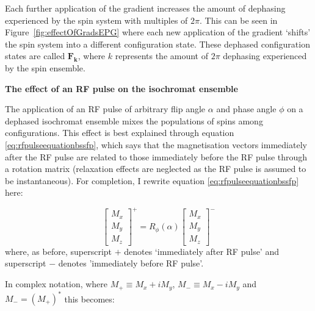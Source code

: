\hfill

Each further application of the gradient increases the amount of dephasing experienced by the spin system with multiples of $2\pi$.
This can be seen in Figure~\ref{fig:effectOfGradsEPG} where each new application of the gradient `shifts' the spin system into a different configuration state.
These dephased configuration states are called $\bm{F_k}$, where $k$ represents the amount of $2\pi$ dephasing experienced by the spin ensemble.

\hfill

\textbf{The effect of an RF pulse on the isochromat ensemble} 

The application of an RF pulse of arbitrary flip angle $\alpha$ and phase angle $\phi$ on a dephased isochromat ensemble mixes the populations of spins among configurations.
This effect is best explained through equation \ref{eq:rfpulseequationbssfp}, which says that the magnetisation vectors immediately after the RF pulse are related to those immediately before the RF pulse through a rotation matrix (relaxation effects are neglected as the RF pulse is assumed to be instantaneous).
For completion, I rewrite equation \ref{eq:rfpulseequationbssfp} here:

\begin{equation}
    \begin{bmatrix} 
    M_x \\
    M_y \\
    M_z
    \end{bmatrix}^+ = 
        R_{\phi}(\alpha)
    \begin{bmatrix} 
    M_x \\
    M_y \\
    M_z
    \end{bmatrix}^-
\end{equation}
where, as before, superscript $+$ denotes `immediately after RF pulse' and superscript $-$ denotes 'immediately before RF pulse'.

\hfill

In complex notation, where $M_+ \equiv M_x + i M_y$,  $M_- \equiv M_x - i M_y$ and $M_- = (M_+)^*$ this becomes:

